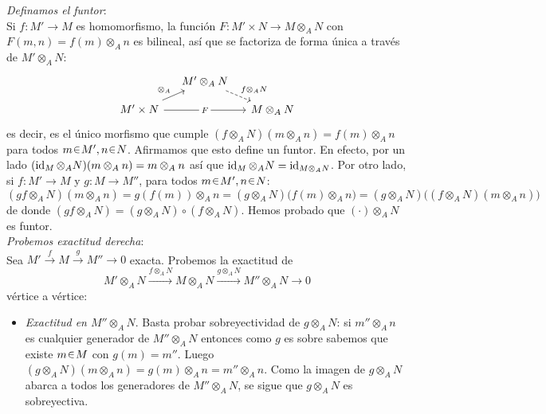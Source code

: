 \begin{sol}
\emph{Definamos el funtor}:\\
Si $f \colon M' \to M$ es homomorfismo, la función $F \colon M'\times N \longrightarrow M \otimes_A N$ con $F(m,n) = f(m) \otimes_A n$ es bilineal, así que se factoriza de forma única a través de $M' \otimes_A N$:
\[\begin{tikzcd}[ampersand replacement=\&,sep = small]
	\& {M' \otimes_A N} \& \\
	M' \times N \&\& M \otimes_A N
	\arrow["{f \otimes_A N}", dashed, from=1-2, to=2-3]
	\arrow["\otimes_A", from=2-1, to=1-2]
	\arrow["F"{description}, from=2-1, to=2-3]
\end{tikzcd}\]
es decir, es el único morfismo que cumple $(f \otimes_A N)(m\otimes_An) = f(m) \otimes_A n$ para todos $m\en M',n\en N$. Afirmamos que esto define un funtor. En efecto, por un lado $(\operatorname{id}_M \otimes_A N)(m \otimes_A n) = m \otimes_A n$ así que $\operatorname{id}_M \otimes_A N=\operatorname{id}_{M \otimes_A N}$. Por otro lado, si $f \colon M' \to M$ y $g \colon M \to M''$, para todos $m\en M', n\en N$:
\[
(gf \otimes_A N)(m \otimes_A n)
= g(f(m)) \otimes_A n
= (g \otimes_A N)\bigl(f(m) \otimes_A n\bigr)
= (g \otimes_A N)\bigl((f \otimes_A N)(m \otimes_A n)\bigr)
\] 
de donde $(gf \otimes_A N) = (g \otimes_A N) \circ (f \otimes_A N)$. Hemos probado que $(\cdot)\otimes_A N$ es funtor.\medskip\\
\emph{Probemos exactitud derecha}:\\
Sea $M' \xrightarrow{f} M \xrightarrow{g} M'' \to 0$ exacta. Probemos la exactitud de
\[
M' \otimes_A N \xrightarrow{f\otimes_AN} M \otimes_A N \xrightarrow{g\otimes_AN} M'' \otimes_A N \longrightarrow 0
\]
vértice a vértice:
\begin{itemize}
    \item\emph{Exactitud en $ M''\otimes_A N$}. Basta probar sobreyectividad de $g\otimes_AN$: si $m''\otimes_An$ es cualquier generador de $M'' \otimes_A N$ entonces como $g$ es sobre sabemos que existe $m\en M$ con $g(m) = m''$. Luego $(g\otimes_A N)(m\otimes_An) = g(m) \otimes_A n = m'' \otimes_An$. Como la imagen de $g\otimes_A N$ abarca a todos los generadores de $M'' \otimes_A N$, se sigue que $g\otimes_A N$ es sobreyectiva.


\end{itemize}
\end{sol}
